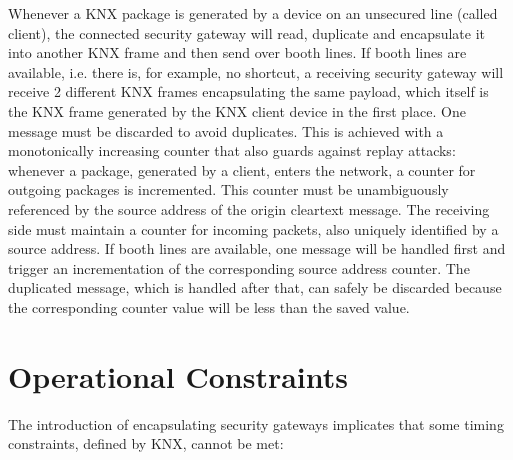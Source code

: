 Whenever a KNX package is
generated by a device on an unsecured line (called client), the connected security gateway will read, duplicate and encapsulate it into another KNX frame 
and then send over booth lines. If booth lines are available, i.e. there is, for example, no shortcut, a receiving security gateway will receive 2
different KNX frames encapsulating the same
payload, which itself is the KNX frame generated by the KNX client device in the first place. 
One message must be discarded to avoid duplicates. 
This is achieved with a monotonically increasing counter that also guards against replay attacks: whenever a package, generated by a client, enters the
network, a counter for outgoing packages is incremented. 
This counter must be unambiguously referenced by the source address of the origin cleartext message. 
The receiving side must maintain a counter for incoming packets, 
also uniquely identified by a source address. If booth lines are available, one message will be handled first and trigger an incrementation of the
corresponding source address counter. The duplicated message, which is handled after that, can safely be discarded because the corresponding counter
value will be less than the saved value.


\section{Operational Constraints}

The introduction of encapsulating security gateways implicates that some timing constraints, defined by KNX, cannot be met:

